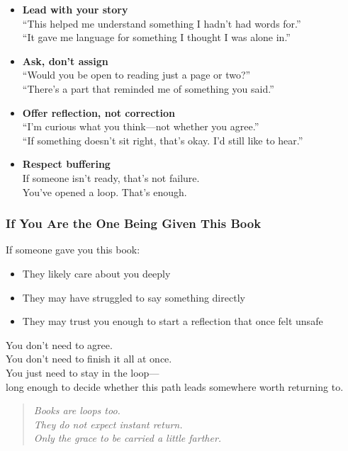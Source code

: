\begin{itemize}
\item
  \textbf{Lead with your story\\
  } ``This helped me understand something I hadn't had words for.''\\
  ``It gave me language for something I thought I was alone in.''
\item
  \textbf{Ask, don't assign\\
  } ``Would you be open to reading just a page or two?''\\
  ``There's a part that reminded me of something you said.''
\item
  \textbf{Offer reflection, not correction\\
  } ``I'm curious what you think---not whether you agree.''\\
  ``If something doesn't sit right, that's okay. I'd still like to
  hear.''
\item
  \textbf{Respect buffering\\
  } If someone isn't ready, that's not failure.\\
  You've opened a loop. That's enough.
\end{itemize}

\subsubsection{\texorpdfstring{\textbf{If You Are the One Being Given
This
Book}}{If You Are the One Being Given This Book}}\label{if-you-are-the-one-being-given-this-book}

If someone gave you this book:

\begin{itemize}
\item
  They likely care about you deeply
\item
  They may have struggled to say something directly
\item
  They may trust you enough to start a reflection that once felt unsafe
\end{itemize}

You don't need to agree.\\
You don't need to finish it all at once.\\
You just need to stay in the loop---\\
long enough to decide whether this path leads somewhere worth returning
to.

\begin{quote}
\emph{Books are loops too.\\
They do not expect instant return.\\
Only the grace to be carried a little farther.}
\end{quote}
